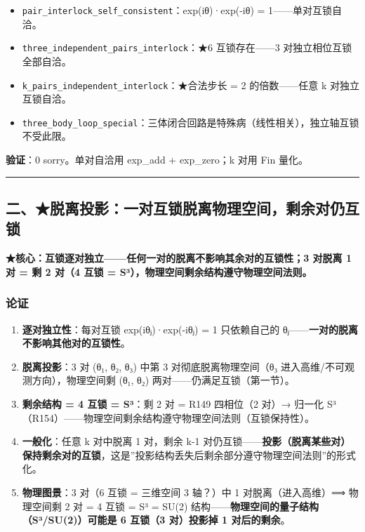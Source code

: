\documentclass[
]{article}
\providecommand{\tightlist}{%
 \setlength{\itemsep}{0pt}\setlength{\parskip}{0pt}}
\begin{document}
\begin{itemize}
\tightlist
\item
 \texttt{pair\_interlock\_self\_consistent}：exp(iθ)·exp(-iθ) =
 1------单对互锁自洽。
\item
 \texttt{three\_independent\_pairs\_interlock}：★6 互锁存在------3
 对独立相位互锁全部自洽。
\item
 \texttt{k\_pairs\_independent\_interlock}：★合法步长 = 2
 的倍数------任意 k 对独立互锁自洽。
\item
 \texttt{three\_body\_loop\_special}：三体闭合回路是特殊病（线性相关），独立轴互锁不受此限。
\end{itemize}

\textbf{验证}：0 sorry。单对自洽用 exp\_add + exp\_zero；k 对用 Fin
量化。

\begin{center}\rule{0.5\linewidth}{0.5pt}\end{center}

\subsection{二、★脱离投影：一对互锁脱离物理空间，剩余对仍互锁}\label{ux4e8cux8131ux79bbux6295ux5f71ux4e00ux5bf9ux4e92ux9501ux8131ux79bbux7269ux7406ux7a7aux95f4ux5269ux4f59ux5bf9ux4ecdux4e92ux9501}

\textbf{★核心：互锁逐对独立------任何一对的脱离不影响其余对的互锁性；3
对脱离 1 对 = 剩 2 对（4 互锁 =
S³），物理空间剩余结构遵守物理空间法则。}

\subsubsection{论证}\label{ux8bbaux8bc1-1}

\begin{enumerate}
\def\labelenumi{\arabic{enumi}.}
\tightlist
\item
 \textbf{逐对独立性}：每对互锁 exp(iθⱼ)·exp(-iθⱼ) = 1 只依赖自己的
 θⱼ------\textbf{一对的脱离不影响其他对的互锁性}。
\item
 \textbf{脱离投影}：3 对 (θ₁, θ₂, θ₃) 中第 3 对彻底脱离物理空间（θ₃
 进入高维/不可观测方向），物理空间剩 (θ₁, θ₂)
 两对------仍满足互锁（第一节）。
\item
 \textbf{剩余结构 = 4 互锁 = S³}：剩 2 对 = R149 四相位（2 对）→ 归一化
 S³（R154）------物理空间剩余结构遵守物理空间法则（互锁保持性）。
\item
 \textbf{一般化}：任意 k 对中脱离 1 对，剩余 k-1
 对仍互锁------\textbf{投影（脱离某些对）保持剩余对的互锁}，这是''投影结构丢失后剩余部分遵守物理空间法则''的形式化。
\item
 \textbf{物理图景}：3 对（6 互锁 = 三维空间 3 轴？）中 1
 对脱离（进入高维）⟹ 物理空间剩 2 对 = 4 互锁 = S³ = SU(2)
 结构------\textbf{物理空间的量子结构（S³/SU(2)）可能是 6 互锁（3
 对）投影掉 1 对后的剩余}。
\end{enumerate}
\end{document}
